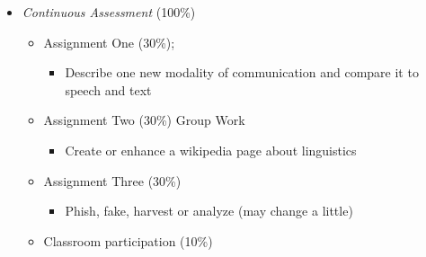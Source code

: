 \documentclass[a4paper,landscape,headrule,footrule,xetex]{foils}
\begin{document}
\begin{itemize} 
\item \textit{Continuous Assessment} (100\%)
\begin{itemize}
\item Assignment One (30\%); 
  \begin{itemize}
  \item Describe one new modality of communication and compare it to
    speech and text 
  \end{itemize}
\item Assignment Two (30\%) Group Work
  \begin{itemize}
  \item Create or enhance a wikipedia page about linguistics
  \end{itemize}
\item Assignment Three (30\%)
  \begin{itemize}
  \item Phish, fake, harvest or analyze (may change a little)
  \end{itemize}
\item Classroom participation  (10\%)
\end{itemize}
\end{itemize}


\end{document}
